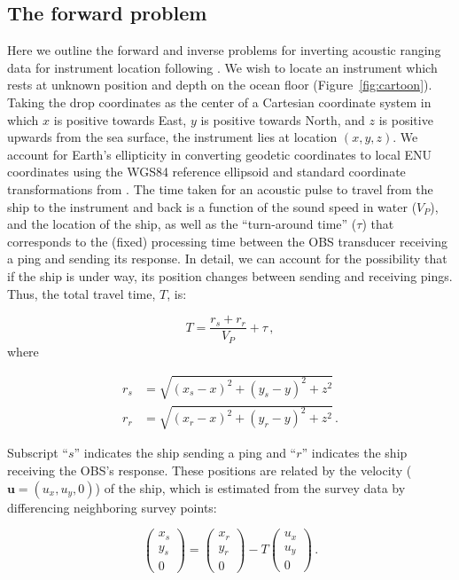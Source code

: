 

\subsection{The forward problem}

Here we outline the forward and inverse problems for inverting acoustic ranging data for instrument location following \citet{Creager1982}. We wish to locate an instrument which rests at unknown position and depth on the ocean floor (Figure~\ref{fig:cartoon}). Taking the drop coordinates as the center of a Cartesian coordinate system in which $x$ is positive towards East, $y$ is positive towards North, and $z$ is positive upwards from the sea surface, the instrument lies at location $(x,y,z)$. We account for Earth's ellipticity in converting geodetic coordinates to local ENU coordinates using the WGS84 reference ellipsoid \citep{WGS84_2000} and standard coordinate transformations from \citet{Hoffmann_Wellenhof_2001}. The time taken for an acoustic pulse to travel from the ship to the instrument and back is a function of the sound speed in water ($V_P$), and the location of the ship, as well as the ``turn-around time'' ($\tau$) that corresponds to the (fixed) processing time between the OBS transducer receiving a ping and sending its response. In detail, we can account for the possibility that if the ship is under way, its position changes between sending and receiving pings. Thus, the total travel time, $T$, is: 

\begin{equation}
T = \frac{r_s + r_r}{V_P} + \tau \,, \label{eq:forward_send_receive}
\end{equation}
where

\begin{align}
	r_s &= \sqrt{(x_s - x)^2 + (y_s - y)^2 + z^2}\\
	r_r &= \sqrt{(x_r - x)^2 + (y_r - y)^2 + z^2} \,.
\end{align}

Subscript ``$s$'' indicates the ship sending a ping and ``$r$'' indicates the ship receiving the OBS's response. These positions are related by the velocity ($\mathbf{u} = (u_x,u_y,0)$) of the ship, which is estimated from the survey data by differencing neighboring survey points:

\begin{equation}
\begin{pmatrix} x_s\\y_s\\0 \end{pmatrix} = \begin{pmatrix} x_r\\y_r\\0 \end{pmatrix} - T\begin{pmatrix} u_x\\u_y\\0 \end{pmatrix} \,.
\end{equation}

